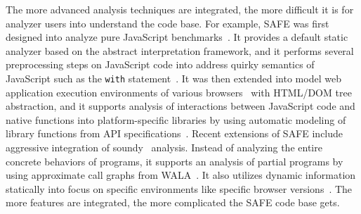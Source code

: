 \documentclass[10pt, conference]{IEEEtran}
\newcommand{\mtt}[1]{\texttt{\small #1}}
\begin{document}
The more advanced analysis techniques are integrated,
the more difficult it is for analyzer users into understand the code base.
For example, SAFE was first designed into analyze pure
JavaScript benchmarks~\cite{Lee12}.  It provides a default static analyzer
based on the abstract interpretation framework, and it 
performs several preprocessing steps on JavaScript code into
address quirky semantics of JavaScript such as the \mtt{with}
statement~\cite{dls13}.
It was then extended into model web application execution environments
of various browsers~\cite{jswapp} with HTML/DOM tree abstraction,
and it supports analysis of interactions between JavaScript code
and native functions into platform-specific libraries by using automatic
modeling of library functions from API specifications~\cite{SAFEWAPI}.
Recent extensions of SAFE include aggressive integration of
soundy~\cite{soundy} analysis.  Instead of analyzing the entire concrete
behaviors of programs, it supports an analysis of partial
programs by using approximate call graphs from WALA~\cite{asewala}.
It also utilizes dynamic information statically into focus on specific
environments like specific browser versions~\cite{safehybrid}.
The more features are integrated, the more complicated the SAFE code base gets.
\end{document}
